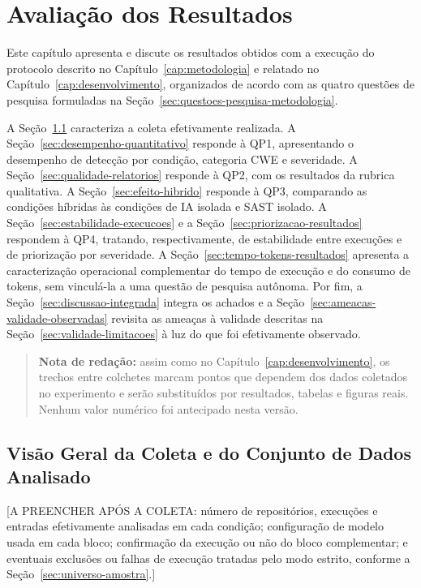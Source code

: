 \chapter{Avaliação dos Resultados}\label{cap:avaliacao}

Este capítulo apresenta e discute os resultados obtidos com a execução do protocolo descrito no Capítulo~\ref{cap:metodologia} e relatado no Capítulo~\ref{cap:desenvolvimento}, organizados de acordo com as quatro questões de pesquisa formuladas na Seção~\ref{sec:questoes-pesquisa-metodologia}.

A Seção~\ref{sec:visao-geral-coleta} caracteriza a coleta efetivamente realizada. A Seção~\ref{sec:desempenho-quantitativo} responde à QP1, apresentando o desempenho de detecção por condição, categoria CWE e severidade. A Seção~\ref{sec:qualidade-relatorios} responde à QP2, com os resultados da rubrica qualitativa. A Seção~\ref{sec:efeito-hibrido} responde à QP3, comparando as condições híbridas às condições de IA isolada e SAST isolado. A Seção~\ref{sec:estabilidade-execucoes} e a Seção~\ref{sec:priorizacao-resultados} respondem à QP4, tratando, respectivamente, de estabilidade entre execuções e de priorização por severidade. A Seção~\ref{sec:tempo-tokens-resultados} apresenta a caracterização operacional complementar do tempo de execução e do consumo de tokens, sem vinculá-la a uma questão de pesquisa autônoma. Por fim, a Seção~\ref{sec:discussao-integrada} integra os achados e a Seção~\ref{sec:ameacas-validade-observadas} revisita as ameaças à validade descritas na Seção~\ref{sec:validade-limitacoes} à luz do que foi efetivamente observado.

\begin{quote}
\textbf{Nota de redação:} assim como no Capítulo~\ref{cap:desenvolvimento}, os trechos entre colchetes marcam pontos que dependem dos dados coletados no experimento e serão substituídos por resultados, tabelas e figuras reais. Nenhum valor numérico foi antecipado nesta versão.
\end{quote}

\section{Visão Geral da Coleta e do Conjunto de Dados Analisado}\label{sec:visao-geral-coleta}

[A PREENCHER APÓS A COLETA: número de repositórios, execuções e entradas efetivamente analisadas em cada condição; configuração de modelo usada em cada bloco; confirmação da execução ou não do bloco complementar; e eventuais exclusões ou falhas de execução tratadas pelo modo estrito, conforme a Seção~\ref{sec:universo-amostra}.]

